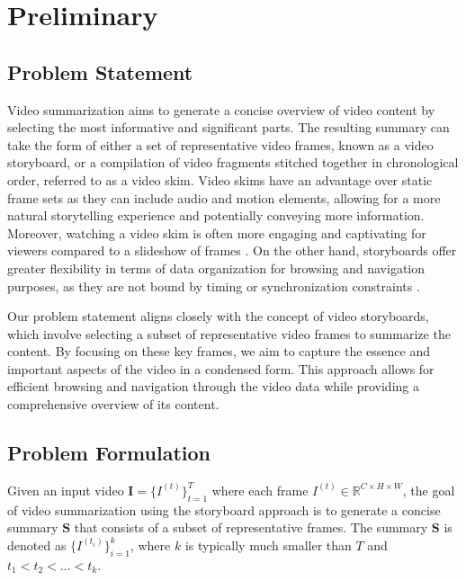\section{Preliminary}
\label{section:rel-preliminary}

\subsection{Problem Statement}
\label{subsec:rel-statement}

Video summarization aims to generate a concise overview of video content by selecting the most informative and significant parts. The resulting summary can take the form of either a set of representative video frames, known as a video storyboard, or a compilation of video fragments stitched together in chronological order, referred to as a video skim. Video skims have an advantage over static frame sets as they can include audio and motion elements, allowing for a more natural storytelling experience and potentially conveying more information. Moreover, watching a video skim is often more engaging and captivating for viewers compared to a slideshow of frames \cite{Li2001Overview}. On the other hand, storyboards offer greater flexibility in terms of data organization for browsing and navigation purposes, as they are not bound by timing or synchronization constraints \cite{Calic2007Comic,Wang2007VideoCollage}.

Our problem statement aligns closely with the concept of video storyboards, which involve selecting a subset of representative video frames to summarize the content. By focusing on these key frames, we aim to capture the essence and important aspects of the video in a condensed form. This approach allows for efficient browsing and navigation through the video data while providing a comprehensive overview of its content.

\subsection{Problem Formulation}
\label{subsec:rel-formulation}
Given an input video $\textbf{I}=\{I^{(t)}\}_{t=1}^T$ where each frame $I^{(t)} \in \mathbb{R} ^{C \times H \times W}$, the goal of video summarization using the storyboard approach is to generate a concise summary $\textbf{S}$ that consists of a subset of representative frames. The summary $\textbf{S}$ is denoted as $\{I^{(t_i)}\}^k_{i=1}$, where $k$ is typically much smaller than $T$ and $t_1 < t_2 < \dots < t_k$.

